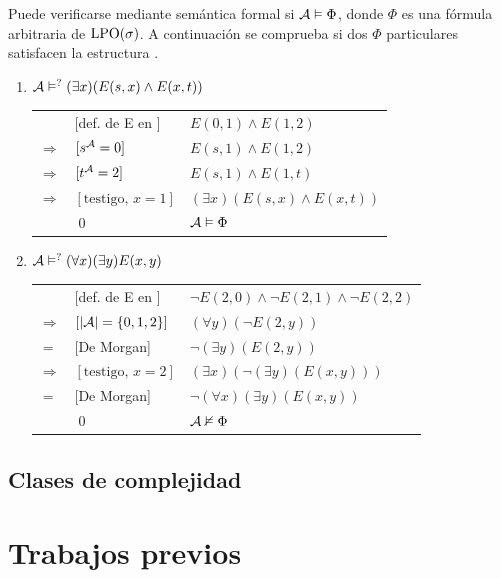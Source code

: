 Puede verificarse mediante semántica formal si $\mathcal{A}\vDash\Phi$, donde $\Phi$
es una fórmula arbitraria de $\text{LPO}(\sigma)$. A continuación se comprueba si dos
$\Phi$ particulares satisfacen la estructura \A.

\begin{enumerate}
\item $\mathcal{A}\vDash^?(\exists x)(E(s,x)\land E(x,t))$
\begin{center}
\begin{tabular}{lll}
&[def. de E en \A] & $E(0, 1) \land E(1, 2)$\\
$\Rightarrow$ & $[s^{\mathcal{A}} = 0]$ & $E(s, 1) \land E(1, 2)$\\
$\Rightarrow$ & $[t^{\mathcal{A}} = 2]$ & $E(s, 1) \land E(1, t)$\\
$\Rightarrow$ & $[\mbox{testigo, } x = 1]$ & $(\exists x)(E(s, x) \land E(x, t))$\\
&\qed & $\mathcal{A} \vDash \Phi$
\end{tabular}
\end{center}

\item $\mathcal{A}\vDash^?(\forall x)(\exists y)E(x,y)$
\begin{center}
\begin{tabular}{lll}
&[def. de E en \A] & $\neg E(2, 0) \land \neg E(2, 1) \land \neg E(2, 2)$\\
$\Rightarrow$ & $[|\mathcal{A}| = \{0,1,2\}]$ & $(\forall y) (\neg E(2, y))$\\
$=$ & [De Morgan] & $\neg (\exists y) (E(2, y))$\\
$\Rightarrow$ & $[\mbox{testigo, } x = 2]$ & $(\exists x) (\neg (\exists y) (E(x, y)))$\\
$=$ & [De Morgan] & $\neg (\forall x) (\exists y) (E(x, y))$\\
&\qed & $\mathcal{A} \nvDash \Phi$
\end{tabular}
\end{center}
\end{enumerate}

\subsection{Clases de complejidad}

\section{Trabajos previos}
